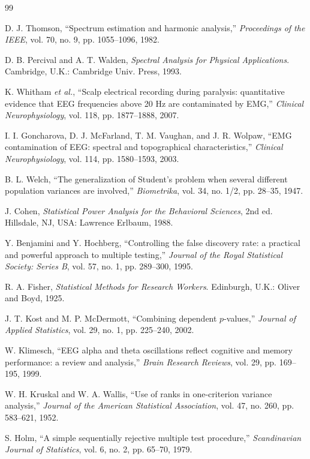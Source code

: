 \documentclass[conference]{IEEEtran}
\begin{document}
\begin{thebibliography}{99}

D. J. Thomson, ``Spectrum estimation and harmonic analysis,'' \emph{Proceedings of the IEEE}, vol. 70, no. 9, pp. 1055--1096, 1982.

D. B. Percival and A. T. Walden, \emph{Spectral Analysis for Physical Applications}. Cambridge, U.K.: Cambridge Univ. Press, 1993.

K. Whitham \emph{et al.}, ``Scalp electrical recording during paralysis: quantitative evidence that EEG frequencies above 20 Hz are contaminated by EMG,'' \emph{Clinical Neurophysiology}, vol. 118, pp. 1877--1888, 2007.

I. I. Goncharova, D. J. McFarland, T. M. Vaughan, and J. R. Wolpaw, ``EMG contamination of EEG: spectral and topographical characteristics,'' \emph{Clinical Neurophysiology}, vol. 114, pp. 1580--1593, 2003.

B. L. Welch, ``The generalization of Student's problem when several different population variances are involved,'' \emph{Biometrika}, vol. 34, no. 1/2, pp. 28--35, 1947.

J. Cohen, \emph{Statistical Power Analysis for the Behavioral Sciences}, 2nd ed. Hillsdale, NJ, USA: Lawrence Erlbaum, 1988.

Y. Benjamini and Y. Hochberg, ``Controlling the false discovery rate: a practical and powerful approach to multiple testing,'' \emph{Journal of the Royal Statistical Society: Series B}, vol. 57, no. 1, pp. 289--300, 1995.

R. A. Fisher, \emph{Statistical Methods for Research Workers}. Edinburgh, U.K.: Oliver and Boyd, 1925.

J. T. Kost and M. P. McDermott, ``Combining dependent $p$-values,'' \emph{Journal of Applied Statistics}, vol. 29, no. 1, pp. 225--240, 2002.

W. Klimesch, ``EEG alpha and theta oscillations reflect cognitive and memory performance: a review and analysis,'' \emph{Brain Research Reviews}, vol. 29, pp. 169--195, 1999.

W. H. Kruskal and W. A. Wallis, ``Use of ranks in one-criterion variance analysis,'' \emph{Journal of the American Statistical Association}, vol. 47, no. 260, pp. 583--621, 1952.

S. Holm, ``A simple sequentially rejective multiple test procedure,'' \emph{Scandinavian Journal of Statistics}, vol. 6, no. 2, pp. 65--70, 1979.

\end{thebibliography}
\end{document}
